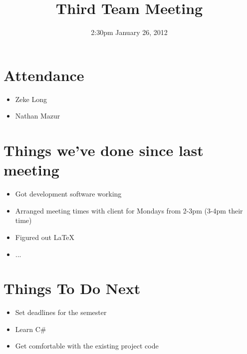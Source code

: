 \documentclass{article}
\begin{document}
\title{Third Team Meeting}
\date{2:30pm January 26, 2012}
\maketitle

\section{Attendance}
\begin{itemize}
\item Zeke Long
\item Nathan Mazur
\end{itemize}

\section{Things we've done since last meeting}
\begin{itemize}
\item Got development software working
\item Arranged meeting times with client for Mondays from 2-3pm (3-4pm their time)
\item Figured out LaTeX
\item ...
\end{itemize}

\section{Things To Do Next}
\begin{itemize}
\item Set deadlines for the semester
\item Learn C#
\item Get comfortable with the existing project code
\end{itemize}
\end{document}
